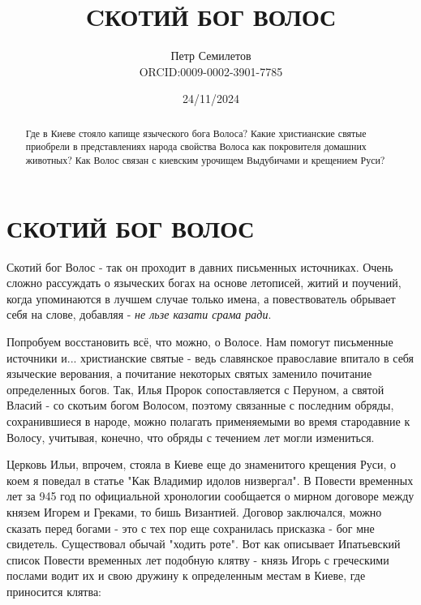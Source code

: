 \documentclass[a5paper,11pt,openany]{article}
\title{CКОТИЙ БОГ ВОЛОС\\
\textsmaller[2]{редакция 1.0}}
\author{Петр Семилетов\\ORCID:0009-0002-3901-7785 \orcidlink{0009-0002-3901-7785}}
\date{24/11/2024}
\begin{document}
\maketitle

\pagestyle{empty}


\newpage

\pagestyle{plain}



%
%
%

\begin{abstract}
Где в Киеве стояло капище языческого бога Волоса? Какие христианские святые приобрели в представлениях народа свойства Волоса как покровителя домашних животных? Как Волос связан с киевским урочищем Выдубичами и крещением Руси?
\end{abstract}


\section{СКОТИЙ БОГ ВОЛОС}

   Скотий бог Волос - так он проходит в давних письменных источниках. Очень сложно рассуждать о языческих богах на основе летописей, житий и поучений, когда упоминаются в лучшем случае только имена, а повествователь обрывает себя на слове, добавляя - \textit{не льзе казати срама ради}.

   Попробуем восстановить всё, что можно, о Волосе. Нам помогут письменные источники и... христианские святые - ведь славянское православие впитало в себя языческие верования, а почитание некоторых святых заменило почитание определенных богов. Так, Илья Пророк сопоставляется с Перуном, а святой Власий - со скотьим богом Волосом, поэтому связанные с последним обряды, сохранившиеся в народе, можно полагать применяемыми во время стародавние к Волосу, учитывая, конечно, что обряды с течением лет могли измениться.

   Церковь Ильи, впрочем, стояла в Киеве еще до знаменитого крещения Руси, о коем я поведал в статье "Как Владимир идолов низвергал". В Повести временных лет за 945 год по официальной хронологии сообщается о мирном договоре между князем Игорем и Греками, то бишь Византией. Договор заключался, можно сказать перед богами - это с тех пор еще сохранилась присказка - бог мне свидетель. Существовал обычай "ходить роте". Вот как описывает Ипатьевский список Повести временных лет подобную клятву - князь Игорь с греческими послами водит их и свою дружину к определенным местам в Киеве, где приносится клятва:
\end{document}
